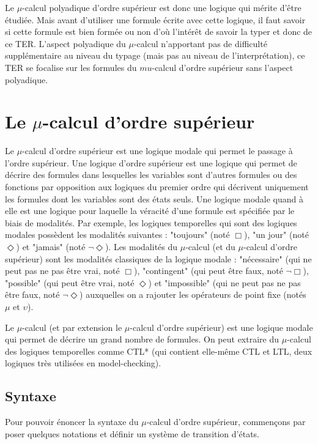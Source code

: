 \documentclass[11pt,a4paper]{article}
\theoremstyle{plain}
\theoremstyle{remark}
\theoremstyle{definition}
\begin{document}
Le $\mu$-calcul polyadique d'ordre supérieur est donc une logique qui mérite d'être étudiée. Mais avant d'utiliser une formule écrite avec cette logique, il faut savoir si cette formule est bien formée ou non d'où l'intérêt de savoir la typer et donc de ce TER. L'aspect polyadique du $\mu$-calcul n'apportant pas de difficulté supplémentaire au niveau du typage (mais pas au niveau de l'interprétation), ce TER se focalise sur les formules du $mu$-calcul d'ordre supérieur sans l'aspect polyadique. 

\section{Le $\mu$-calcul d'ordre supérieur}

Le $\mu$-calcul d'ordre supérieur est une logique modale qui permet le passage à l'ordre supérieur. Une logique d'ordre supérieur est une logique qui permet de décrire des formules dans lesquelles les variables sont d'autres formules ou des fonctions par opposition aux logiques du premier ordre qui décrivent uniquement les formules dont les variables sont des états seuls. Une logique modale quand à elle est une logique pour laquelle la véracité d'une formule est spécifiée par le biais de modalités. Par exemple, les logiques temporelles qui sont des logiques modales possèdent les modalités suivantes : "toujours" (noté $\Box$), "un jour" (noté $\Diamond$) et "jamais" (noté $\neg \Diamond$). Les modalités du $\mu$-calcul (et du $\mu$-calcul d'ordre supérieur) sont les modalités classiques de la logique modale : "nécessaire" (qui ne peut pas ne pas être vrai, noté $\Box$), "contingent" (qui peut être faux, noté $\neg \Box$), "possible" (qui peut être vrai, noté $\Diamond$) et "impossible" (qui ne peut pas ne pas être faux, noté $\neg \Diamond$) auxquelles on a rajouter les opérateurs de point fixe (notés $\mu$ et $\upsilon$).

Le $\mu$-calcul (et par extension le $\mu$-calcul d'ordre supérieur) est une logique modale qui permet de décrire un grand nombre de formules. On peut extraire du $\mu$-calcul des logiques temporelles comme CTL* (qui contient elle-même CTL et LTL, deux logiques très utilisées en model-checking). 
 
\subsection{Syntaxe}

Pour pouvoir énoncer la syntaxe du $\mu$-calcul d'ordre supérieur, commençons par poser quelques notations et définir un système de transition d'états. 
\end{document}

